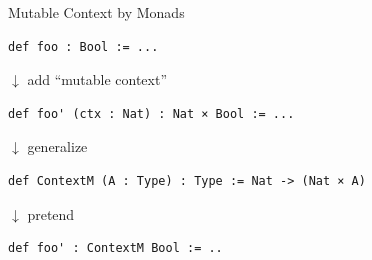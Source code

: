 \documentclass[aspectratio=169]{beamer}
\begin{document}

\begin{frame}[fragile]{Mutable Context by Monads}

\begin{lstlisting}
def foo : Bool := ...
\end{lstlisting}

\pause

$\downarrow$ \; add ``mutable context''

\vspace{2mm}

\begin{lstlisting}
def foo' (ctx : Nat) : Nat × Bool := ...
\end{lstlisting}

\pause

$\downarrow$ \; generalize

\vspace{2mm}

\begin{lstlisting}
def ContextM (A : Type) : Type := Nat -> (Nat × A)
\end{lstlisting}

\pause

$\downarrow$ \; pretend

\vspace{2mm}

\begin{lstlisting}
def foo' : ContextM Bool := ..
\end{lstlisting}

\end{frame}

\end{document}
